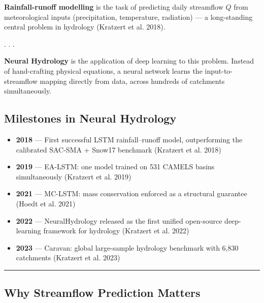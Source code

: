 \documentclass[
  letterpaper,
  DIV=11,
  numbers=noendperiod]{scrartcl}
\providecommand{\tightlist}{%
  \setlength{\itemsep}{0pt}\setlength{\parskip}{0pt}}
\begin{document}
\textbf{Rainfall-runoff modelling} is the task of predicting daily
streamflow \(Q\) from meteorological inputs (precipitation, temperature,
radiation) --- a long-standing central problem in hydrology (Kratzert et
al. 2018).

. . .

\textbf{Neural Hydrology} is the application of deep learning to this
problem. Instead of hand-crafting physical equations, a neural network
learns the input-to-streamflow mapping directly from data, across
hundreds of catchments simultaneously.

\subsection{Milestones in Neural
Hydrology}\label{milestones-in-neural-hydrology}

\begin{itemize}
\tightlist
\item
  \textbf{2018} --- First successful LSTM rainfall--runoff model,
  outperforming the calibrated SAC-SMA + Snow17 benchmark (Kratzert et
  al. 2018)
\item
  \textbf{2019} --- EA-LSTM: one model trained on 531 CAMELS basins
  simultaneously (Kratzert et al. 2019)
\item
  \textbf{2021} --- MC-LSTM: mass conservation enforced as a structural
  guarantee (Hoedt et al. 2021)
\item
  \textbf{2022} --- NeuralHydrology released as the first unified
  open-source deep-learning framework for hydrology (Kratzert et al.
  2022)
\item
  \textbf{2023} --- Caravan: global large-sample hydrology benchmark
  with 6,830 catchments (Kratzert et al. 2023)
\end{itemize}

\begin{center}\rule{0.5\linewidth}{0.5pt}\end{center}

\subsection{Why Streamflow Prediction
Matters}\label{why-streamflow-prediction-matters}
\end{document}
